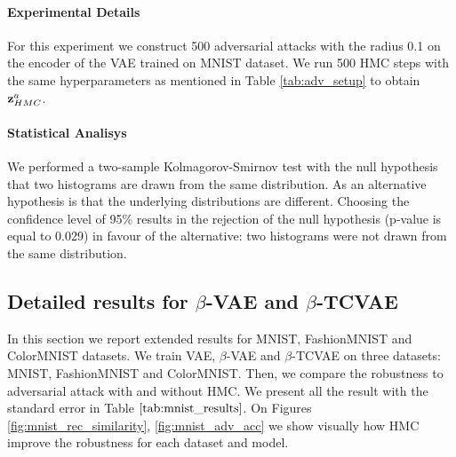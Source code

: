\paragraph{Experimental Details}
For this experiment we construct 500 adversarial attacks with the radius 0.1 on the encoder of the VAE trained on MNIST dataset. We run 500 HMC steps with the same hyperparameters as mentioned in Table \ref{tab:adv_setup} to obtain ${\mathbf{z}}^a_{HMC}$.

\paragraph{Statistical Analisys}
We performed a two-sample Kolmagorov-Smirnov test with the null hypothesis that two histograms are drawn from the same distribution. As an alternative hypothesis is that the underlying distributions are different. Choosing the confidence level of 95\% results in the rejection of the null hypothesis (p-value is equal to 0.029) in favour of the alternative: two histograms were not drawn from the same distribution.




\newpage
\subsection{Detailed results for $\beta$-VAE and $\beta$-TCVAE} \label{appendix:beta_vae}
In this section we report extended results for MNIST, FashionMNIST and ColorMNIST datasets. We train VAE,  $\beta$-VAE and $\beta$-TCVAE on three datasets: MNIST, FashionMNIST and ColorMNIST. Then, we compare the robustness to adversarial attack with and without HMC. We present all the result with the standard error in Table $\ref{tab:mnist_results}$. On Figures \ref{fig:mnist_rec_similarity}, \ref{fig:mnist_adv_acc} we show visually how HMC improve the robustness for each dataset and model. 

